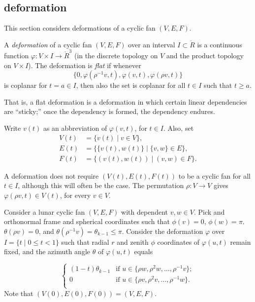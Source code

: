\subsection{deformation}

This section considers deformations of a cyclic fan $(V,E,F)$.

\begin{definition}
A {\it deformation} of a cyclic fan $(V,E,F)$ over an interval $I\subset\ring{R}$
is a 
continuous function $\varphi:V\times I \to\ring{R}^3$ (in the discrete topology on $V$ and the product topology on $V\times I$).
The deformation is {\it flat} if whenever
$$\{0,\varphi(\rho^{-1}v,t),\varphi(v,t),\varphi(\rho v,t)\}$$
is coplanar for $t=a\in I$, then also the set is coplanar for all $t\in I$ such
that $t\ge a$.
\end{definition}
%
%
%

That is, a flat deformation is a deformation in which certain linear
dependencies are ``sticky;''  once the dependency is formed, the dependency endures.

Write $v(t)$ as an abbreviation of $\varphi(v,t)$, for $t\in I$.  
Also, set
$$
\begin{array}{lll}
V(t)&=\{v(t) \mid v\in V\},\\
E(t)&=\{\{v(t),w(t)\}\mid \{v,w\}\in E\},\\
F(t)&= \{(v(t),w(t)) \mid  (v,w)\in F\}.
\end{array}
$$


A deformation does not require $(V(t),E(t),F(t))$ to be a cyclic fan for all $t\in I$, although this will often be the case. The permutation $\rho:V\to V$ gives $\varphi(\rho v,t)\in V(t)$, for every $v\in V$.  


\begin{example}
Consider a lunar cyclic fan $(V,E,F)$ with dependent $v,w\in V$.   Pick and orthonormal frame and spherical coordinates such that $\phi(v)=0$, $\phi(w)=\pi$.  $\theta(\rho v)=0$, and $\theta(\rho^{-1} v)=\theta_{k-1}\le\pi$.  Consider the deformation $\varphi$ over 
$I = \{t \mid 0 \le t < 1\}$
such that radial $r$ and zenith $\phi$ coordinates of $\varphi(u,t)$ remain fixed,
and the azimuth angle $\theta$ of $\varphi(u,t)$ equals

$$
\begin{cases} 
   (1-t) \theta_{k-1} & \text{if } u\in \{\rho w,\rho^2 w,\ldots, \rho^{-1} v\};\\
   0 & \text{if } u\in \{\rho v,\rho^2 v,\ldots,\rho^{-1} w\}.\\
\end{cases}
$$
Note that $(V(0),E(0),F(0)) = (V,E,F)$.
\end{example}
%
%

